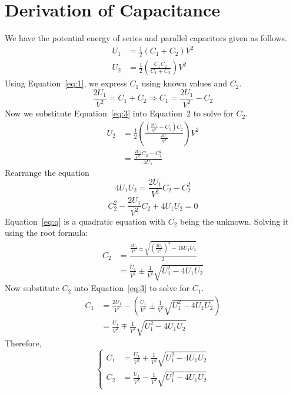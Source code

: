 \documentclass[12pt]{article}
\begin{document}
\section{Derivation of Capacitance}

We have the potential energy of series and parallel capacitors given as follows.
\begin{align}
    U_1 &= \frac{1}{2} (C_1 + C_2) V^2 \\ \label{eq:1}
    U_2 &= \frac{1}{2} \left( \frac{C_1 C_2}{C_1 + C_2} \right) V^2
\end{align}
Using Equation~\ref{eq:1}, we express $C_1$ using known values and $C_2$.
\begin{equation}
    \frac{2U_1}{V^2} = C_1 + C_2 \Rightarrow C_1 = \frac{2U_1}{V^2} - C_2 \label{eq:3}
\end{equation}
Now we substitute Equation~\ref{eq:3} into Equation~2 to solve for $C_2$.
\begin{align*}
    U_2 &= \frac{1}{2} \left(
        \frac{(\frac{2U_1}{V^2} - C_2)C_2}{\frac{2U_1}{V^2}}
    \right) V^2 \\
        &= \frac{\frac{2U_1}{V^2}C_2 - C_2^2}{4U_1}
\end{align*}
Rearrange the equation
\begin{equation*}
    4U_1U_2 = \frac{2U_1}{V^2}C_2 - C_2^2
\end{equation*}
\begin{equation}\label{eq:q}
    C_2^2 - \frac{2U_1}{V^2}C_2 + 4U_1U_2 = 0 
\end{equation}
Equation~\ref{eq:q} is a quadratic equation with $C_2$ being the unknown. Solving it using the root formula:
\begin{align*}
    C_2 &= \frac{\frac{2U_1}{V^2} \pm \sqrt{\left(\frac{2U_1}{V^2}\right)^2 - 16 U_1 U_2}}{2} \\
        &= \frac{U_1}{V^2} \pm \frac{1}{V^2} \sqrt{U_1^2 - 4 U_1 U_2}
\end{align*}
Now substitute $C_2$ into Equation~\ref{eq:3} to solve for $C_1$.
\begin{align*}
    C_1 &= \frac{2U_1}{V^2} - \left(
        \frac{U_1}{V^2} \pm \frac{1}{V^2} \sqrt{U_1^2 - 4 U_1 U_2}
    \right) \\
        &= \frac{U_1}{V^2} \mp \frac{1}{V^2} \sqrt{U_1^2 - 4 U_1 U_2}
\end{align*}
Therefore,
\def\arraystretch{1.5}
\begin{equation*}
    \left\{
    \begin{array}{ll}
        C_1 &= \frac{U_1}{V^2} + \frac{1}{V^2} \sqrt{U_1^2 - 4 U_1 U_2} \\
        C_2 &= \frac{U_1}{V^2} - \frac{1}{V^2} \sqrt{U_1^2 - 4 U_1 U_2}
    \end{array}
    \right.
\end{equation*}
\end{document}
